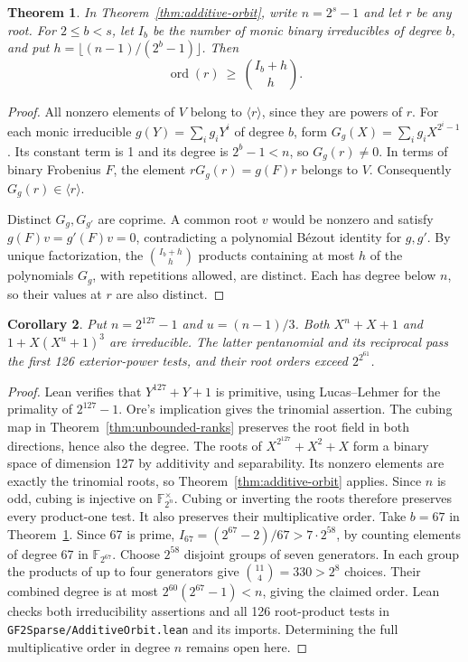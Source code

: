 \documentclass[11pt]{article}
\newtheorem{theorem}{Theorem}
\newtheorem{corollary}[theorem]{Corollary}
\newcommand{\ord}{\operatorname{ord}}
\begin{document}
\begin{theorem}\label{thm:additive-order}
In Theorem~\ref{thm:additive-orbit}, write \(n=2^s-1\) and let
\(r\) be any root. For \(2\le b<s\), let \(I_b\) be the number
of monic binary irreducibles of degree \(b\), and put
\(h=\lfloor(n-1)/(2^b-1)\rfloor\). Then
\[
                   \ord(r)\ \ge\ \binom{I_b+h}{h}.
\]
\end{theorem}
\begin{proof}
All nonzero elements of \(V\) belong to \(\langle r\rangle\),
since they are powers of \(r\). For each monic irreducible
\(g(Y)=\sum_i g_iY^i\) of degree \(b\), form
\(G_g(X)=\sum_i g_i X^{2^i-1}\). Its constant term is 1 and its
degree is \(2^b-1<n\), so \(G_g(r)\ne0\). In terms of binary
Frobenius \(F\), the element \(rG_g(r)=g(F)r\) belongs to \(V\).
Consequently \(G_g(r)\in\langle r\rangle\).

Distinct \(G_g,G_{g'}\) are coprime. A common root \(v\) would be
nonzero and satisfy \(g(F)v=g'(F)v=0\), contradicting a polynomial
Bézout identity for \(g,g'\). By unique factorization, the
\(\binom{I_b+h}{h}\) products containing at most \(h\) of the
polynomials \(G_g\), with repetitions allowed, are distinct.
Each has degree below \(n\), so their values at \(r\) are also distinct.
\end{proof}

\begin{corollary}\label{cor:mersenne-127}
Put \(n=2^{127}-1\) and \(u=(n-1)/3\). Both \(X^n+X+1\) and
\(1+X(X^u+1)^3\) are irreducible. The latter pentanomial and its
reciprocal pass the first 126 exterior-power tests, and their root
orders exceed \(2^{2^{61}}\).
\end{corollary}
\begin{proof}
Lean verifies that \(Y^{127}+Y+1\) is primitive, using Lucas--Lehmer
for the primality of \(2^{127}-1\). Ore's implication gives the
trinomial assertion. The cubing map in Theorem~\ref{thm:unbounded-ranks}
preserves the root field in both directions, hence also the degree.
The roots of \(X^{2^{127}}+X^2+X\) form a binary space of dimension
127 by additivity and separability. Its nonzero elements are exactly
the trinomial roots, so Theorem~\ref{thm:additive-orbit} applies.
Since \(n\) is odd, cubing is injective on \(\mathbb F_{2^n}^\times\).
Cubing or inverting the roots therefore preserves every product-one test.
It also preserves their multiplicative order. Take \(b=67\) in
Theorem~\ref{thm:additive-order}. Since 67 is prime,
\(I_{67}=(2^{67}-2)/67>7\cdot2^{58}\), by counting elements of
degree 67 in \(\mathbb F_{2^{67}}\). Choose \(2^{58}\) disjoint
groups of seven generators. In each group the products of up to four
generators give \(\binom{11}{4}=330>2^8\) choices. Their combined
degree is at most \(2^{60}(2^{67}-1)<n\), giving the claimed order.
Lean checks both irreducibility assertions and all 126 root-product
tests in \texttt{GF2Sparse/AdditiveOrbit.lean} and its imports.
Determining the full multiplicative order in degree \(n\) remains open here.
\end{proof}
\end{document}

